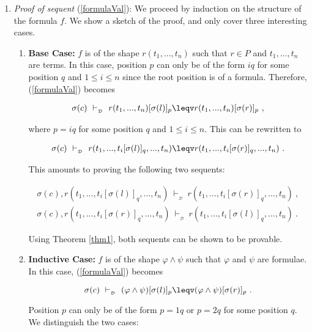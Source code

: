 \documentclass[copyright]{eptcs}
\begin{document}
\begin{enumerate}
\item \textit{Proof of sequent} (\ref{formulaVal}): We proceed by induction on the structure of the formula $f$. We show a sketch of the proof, and only cover three interesting cases.
\begin{enumerate}
\item \textbf{Base Case:} $f$ is of the shape $r(t_1,...,t_n)$ such that $r \in P$ and $t_1,...,t_n$ are terms. In this case, position $p$ can only be of the form $iq$ for some position $q$ and $1\leq i \leq n$ since the root position is of a formula.
Therefore, (\ref{formulaVal}) becomes
\begin{small}
\begin{eqnarray*}
\sigma(c)~\vdash_{_\mathcal{D}}~r(t_1,...,t_n)[\sigma(l)]_p \leqv r(t_1,...,t_n)[\sigma(r)]_p~,
\end{eqnarray*}
\end{small}
where $p=iq$ for some position $q$ and $1\leq i \leq n$. This can be rewritten to
\begin{small}
\begin{eqnarray*}
\sigma(c)~\vdash_{_\mathcal{D}}~r(t_1,...,t_i[\sigma(l)]_q,...,t_n) \leqv r(t_1,...,t_i[\sigma(r)]_q,...,t_n)~.
\end{eqnarray*}
\end{small}
This amounts to proving the following two sequents:
\begin{small}
\begin{eqnarray*}
\sigma(c), r(t_1,...,t_i[\sigma(l)]_q,...,t_n)~\vdash_{_\mathcal{D}}~r(t_1,...,t_i[\sigma(r)]_q,...,t_n)~,\\
\sigma(c), r(t_1,...,t_i[\sigma(r)]_q,...,t_n)~\vdash_{_\mathcal{D}}~r(t_1,...,t_i[\sigma(l)]_q,...,t_n)~.
\end{eqnarray*}
\end{small}
Using Theorem \ref{thm1}, both sequents can be shown to be provable.
\item \textbf{Inductive Case:} $f$ is of the shape $\varphi \land \psi$ such that $\varphi$ and $\psi$ are formulae. In this case, (\ref{formulaVal}) becomes
\begin{small}
\begin{equation}
\sigma(c)~\vdash_{_\mathcal{D}}~(\varphi \land \psi)[\sigma(l)]_p \leqv (\varphi \land \psi)[\sigma(r)]_p~.\label{seq3.5}
\end{equation}
\end{small}
Position $p$ can only be of the form $p=1q$ or $p=2q$ for some position $q$. We distinguish the two cases:

\end{enumerate}
\end{enumerate}
\end{document}
